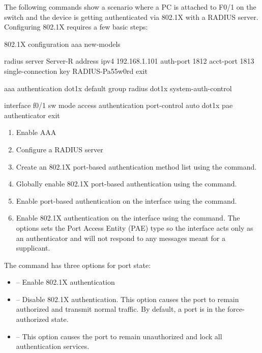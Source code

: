 The following commands show a scenario where a PC is attached to F0/1 on the switch and the device is getting authenticated via 802.1X with a RADIUS server. Configuring 802.1X requires a few basic steps:



\begin{sexylisting}{802.1X configuration}
aaa new-models

radius server Server-R
  address ipv4 192.168.1.101 auth-port 1812 acct-port 1813
  single-connection
  key RADIUS-Pa55w0rd
  exit
 
aaa authentication dot1x default group radius
dot1x system-auth-control

interface f0/1
  sw mode access
  authentication port-control auto
  dot1x pae authenticator
  exit
\end{sexylisting}

\begin{enumerate}
\item Enable AAA 
\item Configure a RADIUS server
\item Create an 802.1X port-based authentication method list using the  command.
\item Globally enable 802.1X port-based authentication using the  command.
\item Enable port-based authentication on the interface using the  command.
\item Enable 802.1X authentication on the interface using the  command. The  options sets the Port Access Entity (PAE) type so the interface acts only as an authenticator and will not respond to any messages meant for a supplicant.
\end{enumerate}

The  command has three options for port state:

\begin{itemize}
\item {} -- Enable 802.1X authentication
\item {} -- Disable 802.1X authentication. This option causes the port to remain authorized and transmit normal traffic. By default, a port is in the force-authorized state.
\item {} -- This option causes the port to remain unauthorized and lock all authentication services.
\end{itemize}
